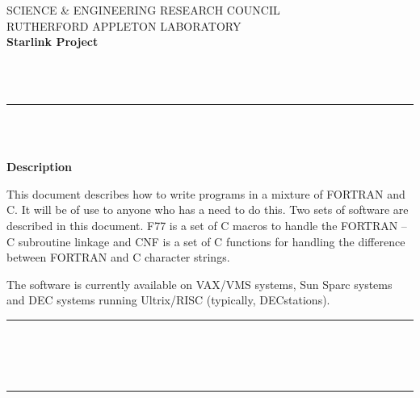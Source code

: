 \thispagestyle{empty}
SCIENCE \& ENGINEERING RESEARCH COUNCIL \hfill \stardocname\\
RUTHERFORD APPLETON LABORATORY\\
{\large\bf Starlink Project\\}
{\large\bf \stardoccategory\ \stardocnumber}
\begin{flushright}
\stardocauthors\\
\stardocdate
\end{flushright}
\vspace{-4mm}
\rule{\textwidth}{0.5mm}
\vspace{5mm}
\begin{center}
{\Huge\bf  \stardoctitle \\ [2.5ex]}
{\LARGE\bf \stardocversion \\ [4ex]}
{\Huge\bf  \stardocmanual}
\end{center}
\vspace{5mm}

\begin{center}
{\Large\bf Description}
\end{center}

This document describes how to write programs in a mixture of FORTRAN and C. It
will be of use to anyone who has a need to do this. Two sets of software are
described in this document. F77 is a set of C macros to handle the FORTRAN -- C
subroutine linkage and CNF is a set of C functions for handling the difference
between FORTRAN and C character strings.

The software is currently available on VAX/VMS systems, Sun Sparc systems and
DEC systems running Ultrix/RISC (typically, DECstations).

\markright{\stardocname}
\newpage
\markright{\stardocname}

\null\vspace {5mm}
\begin {center}
\rule{80mm}{0.5mm} \\ [1ex]
{\Large\bf \stardoctitle \\ [2.5ex]
           \stardocversion} \\ [2ex]
\rule{80mm}{0.5mm}
\end{center}
\vspace{30mm}

\setlength{\parskip}{0mm}
\tableofcontents
\setlength{\parskip}{\medskipamount}
\markright{\stardocname}
\newpage
\renewcommand{\thepage}{\arabic{page}}
\setcounter{page}{1}

